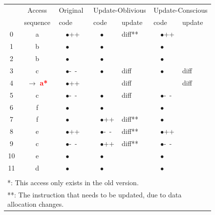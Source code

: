 \begin{figure}[htbp]
\begin{small}
\begin{center}

\begin{tabular}{|c|c||l||l|l||l|l|} \hline

    & Access   & Original      & \multicolumn{2}{l||}{Update-Oblivious} & \multicolumn{2}{l|}{Update-Conscious} \\ \cline{4-7}
    & sequence & code         & code        & update & code         & update \\ \hline \hline
 0  & a        & ~~$\bullet$++  & ~~$\bullet$   & diff**   & ~~$\bullet$++  &        \\ 
 1  & b        & ~~$\bullet$    & ~~$\bullet$   &        & ~~$\bullet$    &        \\
 2  & b        & ~~$\bullet$    & ~~$\bullet$   &        & ~~$\bullet$    &        \\
 3  & c        & ~~$\bullet$-~- & ~~$\bullet$   & diff   & ~~$\bullet$    & diff   \\
 4  & $\rightarrow$ \textcolor{red}{\bf{a*}}
               & ~~$\bullet$++  &               & diff   &                & diff   \\
 5  & c        & ~~$\bullet$-~- & ~~$\bullet$   & diff   & ~~$\bullet$-~- &        \\
 6  & f        & ~~$\bullet$    & ~~$\bullet$   &        & ~~$\bullet$    &        \\
 7  & f        & ~~$\bullet$    & ~~$\bullet$++ & diff**   & ~~$\bullet$    &        \\
 8  & e        & ~~$\bullet$++  & ~~$\bullet$-~-& diff**   & ~~$\bullet$++  &        \\
 9  & c        & ~~$\bullet$-~- & ~~$\bullet$++ & diff**   & ~~$\bullet$-~- &        \\
 10 & e        & ~~$\bullet$    & ~~$\bullet$   &        & ~~$\bullet$    &        \\
 11 & d        & ~~$\bullet$    & ~~$\bullet$   &        & ~~$\bullet$    &        \\ \hline 
\multicolumn{7}{l}{ } \\
\multicolumn{7}{l}{*: This access only exists in the old version.}\\
\multicolumn{7}{l}{**: The instruction that needs to be updated, due to data allocation changes.}\\

\end{tabular}
\end{center}
\end{small}
\end{figure}
